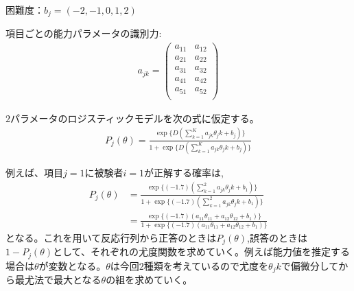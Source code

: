 \documentclass[20pt]{jarticle}
\begin{document}
困難度：$b_j = (-2, -1, 0, 1, 2)$

項目ごとの能力パラメータの識別力:
\begin{align}
  \label{04}
  \displaystyle
    a_{jk} =
    \begin{pmatrix}
      a_{11} & a_{12} \\
      a_{21} & a_{22} \\
      a_{31} & a_{32} \\
      a_{41} & a_{42} \\
      a_{51} & a_{52} \\
    \end{pmatrix}
  \tag{4}
\end{align}

$2$パラメータのロジスティックモデルを次の式に仮定する。
\begin{align}
  \label{05}
  \displaystyle
    P_j (\theta) = \frac{\exp\{D(\sum\limits_{k = 1}^{K} a_{jk}\theta_jk + b_j) \}}{1 + \exp\{D(\sum\limits_{k = 1}^{K} a_{jk}\theta_jk + b_j)\}}
  \tag{5}
\end{align}

例えば、項目$j=1$に被験者$i=1$が正解する確率は,
\begin{align*}
  \label{06}
  \displaystyle
  P_j (\theta) &= \frac{\exp\{(-1.7)(\sum\limits_{k = 1}^{2} a_{jk}\theta_jk + b_1) \}}{1 + \exp\{(-1.7)(\sum\limits_{k = 1}^{2} a_{jk}\theta_jk + b_1)\}}\\
  &= \frac{\exp\{(-1.7)(a_{11} \theta_{11} + a_{12}\theta_{12} + b_1) \}}{1 + \exp\{(-1.7)(a_{11} \theta_{11} + a_{12}\theta_{12} + b_1)\}}
  \tag{6}
\end{align*}
となる。これを用いて反応行列から正答のときは$P_j(\theta)$,誤答のときは$1 - P_j(\theta)$として、それぞれの尤度関数を求めていく。例えば能力値を推定する場合は$\theta$が変数となる。$\theta$は今回$2$種類を考えているので尤度を$\theta_jk$で偏微分してから最尤法で最大となる$\theta$の組を求めていく。
\end{document}

